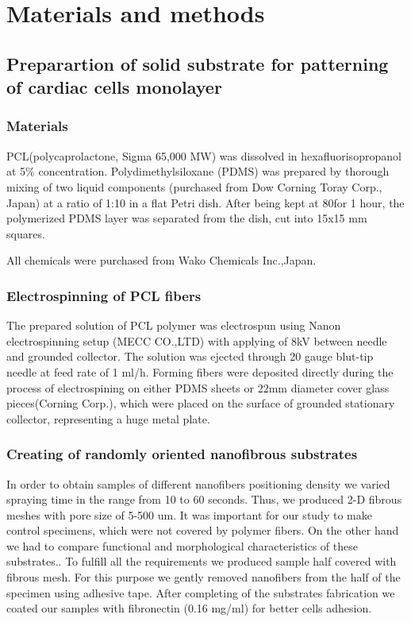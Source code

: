 \section{Materials and methods}
\label{sec:methods}

\subsection{Preparartion of solid substrate for patterning of cardiac cells monolayer}
\subsubsection{Materials}
	\label{sec:specimen_preparation_electrospinning}


PCL(polycaprolactone, Sigma 65,000 MW) was dissolved in hexafluorisopropanol at 5\% concentration.  
Polydimethylsiloxane (PDMS) was prepared by thorough mixing of two liquid components (purchased from Dow Corning Toray Corp., Japan) at a ratio of 1:10 in a flat Petri dish.
 After being kept at 80\gc\space for 1 hour, the polymerized PDMS layer was separated from the dish, cut into 15x15 mm squares.

All chemicals were purchased from Wako Chemicals Inc.,Japan.
\subsubsection{Electrospinning of PCL fibers}
The prepared solution of PCL polymer was electrospun using Nanon electrospinning setup (MECC CO.,LTD) with applying of 8kV between needle and grounded collector.
 The solution was ejected through 20 gauge blut-tip needle at feed rate of 1 ml/h. 
 Forming fibers were deposited directly during the process of electrospining on either PDMS sheets or 22mm diameter cover glass pieces(Corning Corp.), which were placed on the surface of grounded stationary collector, representing a huge metal plate.    
\subsubsection{Creating of randomly oriented nanofibrous substrates}
In order to obtain samples of different nanofibers positioning density we varied spraying time in the range from 10 to 60 seconds.
Thus, we produced 2-D fibrous meshes with pore size of 5-500 um. 
It was important for our study to make control specimens, which were not covered by polymer fibers.
On the other hand we had to compare functional and morphological characteristics of these substrates..
To fulfill all the requirements we produced sample half covered with fibrous mesh.
For this purpose we gently removed nanofibers from the half of the specimen using adhesive tape.
After completing of the substrates fabrication we coated our samples with fibronectin (0.16 mg/ml) for better cells adhesion.
